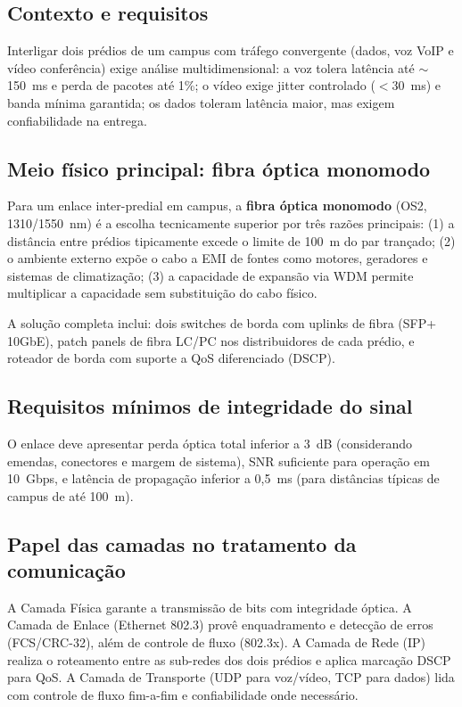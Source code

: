 \documentclass[conference]{IEEEtran}
\begin{document}
\subsection*{Contexto e requisitos}

Interligar dois prédios de um campus com tráfego convergente (dados, voz VoIP e vídeo
conferência) exige análise multidimensional: a voz tolera latência até $\sim$150~ms e perda
de pacotes até 1\%; o vídeo exige jitter controlado ($<$30~ms) e banda mínima garantida;
os dados toleram latência maior, mas exigem confiabilidade na entrega.

\subsection*{Meio físico principal: fibra óptica monomodo}

Para um enlace inter-predial em campus, a \textbf{fibra óptica monomodo} (OS2, 1310/1550~nm)
é a escolha tecnicamente superior por três razões principais: (1) a distância entre prédios
tipicamente excede o limite de 100~m do par trançado; (2) o ambiente externo expõe o cabo a
EMI de fontes como motores, geradores e sistemas de climatização; (3) a capacidade de expansão
via WDM permite multiplicar a capacidade sem substituição do cabo físico.

A solução completa inclui: dois switches de borda com uplinks de fibra (SFP+ 10GbE),
patch panels de fibra LC/PC nos distribuidores de cada prédio, e roteador de borda com
suporte a QoS diferenciado (DSCP).

\subsection*{Requisitos mínimos de integridade do sinal}

O enlace deve apresentar perda óptica total inferior a 3~dB (considerando emendas, conectores
e margem de sistema), SNR suficiente para operação em 10~Gbps, e latência de propagação
inferior a 0,5~ms (para distâncias típicas de campus de até 100~m).

\subsection*{Papel das camadas no tratamento da comunicação}

A Camada Física garante a transmissão de bits com integridade óptica. A Camada de Enlace
(Ethernet 802.3) provê enquadramento e detecção de erros (FCS/CRC-32), além de controle de
fluxo (802.3x). A Camada de Rede (IP) realiza o roteamento entre as sub-redes dos dois
prédios e aplica marcação DSCP para QoS. A Camada de Transporte (UDP para voz/vídeo, TCP
para dados) lida com controle de fluxo fim-a-fim e confiabilidade onde necessário.
\end{document}
